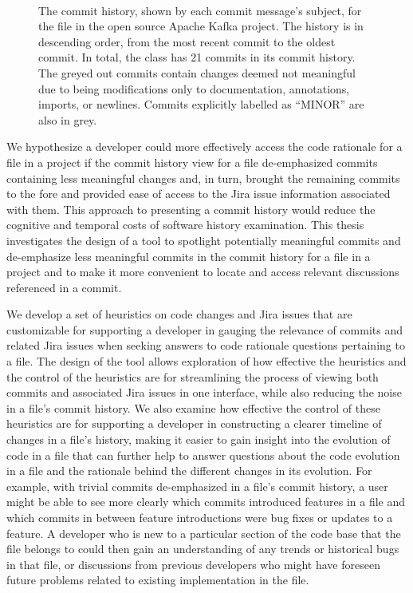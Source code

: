 \begin{figure}
\begin{RaggedRight}
	 \\
	\caption{The commit history, shown by each commit message's subject, for the  file in the open source Apache Kafka project. 		The history is in descending order, from the most recent commit to the oldest commit.
		In total, the  class has 21 commits in its commit history. The greyed out commits contain changes deemed not meaningful due 		to being modifications only to documentation, annotations, imports, or newlines. Commits explicitly labelled as ``MINOR'' are also in grey.}
	\label{fig:Topology-Commit-History}
\end{RaggedRight}
\end{figure}

We hypothesize a developer could more effectively access the code rationale for a file in a project if the commit history view for a file de-emphasized commits containing less meaningful changes and, in turn, brought the remaining commits to the fore and provided ease of access to the Jira issue information associated with them.
This approach to presenting a commit history would reduce the cognitive and temporal costs of software history examination. %
This thesis investigates the design of a tool to spotlight potentially meaningful commits and de-emphasize less meaningful commits in the commit history for a file in a project and to make it more convenient to locate and access relevant discussions referenced in a commit. 

We develop a set of heuristics on code changes and Jira issues that are customizable for supporting a developer in gauging the relevance of commits and related Jira issues when seeking answers to code rationale questions pertaining to a file.
The design of the tool allows exploration of how effective the heuristics and the control of the heuristics are for streamlining the process of viewing both commits and associated Jira issues in one interface, while also reducing the noise in a file's commit history.
We also examine how effective the control of these heuristics are for supporting a developer in constructing a clearer timeline of changes in a file's history, making it easier to gain insight into the evolution of code in a file that can further help to answer questions about the code evolution in a file and the rationale behind the different changes in its evolution. 
For example, with trivial commits de-emphasized in a file's commit history, a user might be able to see more clearly which commits introduced features in a file and which commits in between feature introductions were bug fixes or updates to a feature.
A developer who is new to a particular section of the code base that the file belongs to could then gain an understanding of any trends or historical bugs in that file, or discussions from previous developers who might have foreseen future problems related to existing implementation in the file.

